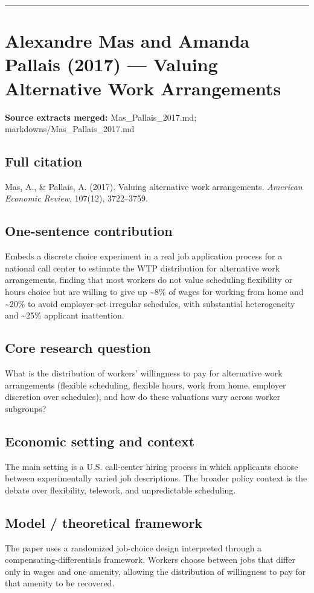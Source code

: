 \documentclass[11pt,a4paper]{article}
\begin{document}
\medskip\hrule\medskip

\section*{Alexandre Mas and Amanda Pallais (2017) — Valuing Alternative Work Arrangements}

\textbf{Source extracts merged:} Mas\_Pallais\_2017.md; markdowns/Mas\_Pallais\_2017.md

\subsection*{Full citation}
Mas, A., \& Pallais, A. (2017). Valuing alternative work arrangements. \textit{American Economic Review}, 107(12), 3722--3759.

\subsection*{One-sentence contribution}
Embeds a discrete choice experiment in a real job application process for a national call center to estimate the WTP distribution for alternative work arrangements, finding that most workers do not value scheduling flexibility or hours choice but are willing to give up \textasciitilde{}8\% of wages for working from home and \textasciitilde{}20\% to avoid employer-set irregular schedules, with substantial heterogeneity and \textasciitilde{}25\% applicant inattention.

\subsection*{Core research question}
What is the distribution of workers' willingness to pay for alternative work arrangements (flexible scheduling, flexible hours, work from home, employer discretion over schedules), and how do these valuations vary across worker subgroups?

\subsection*{Economic setting and context}
The main setting is a U.S. call-center hiring process in which applicants choose between experimentally varied job descriptions. The broader policy context is the debate over flexibility, telework, and unpredictable scheduling.

\subsection*{Model / theoretical framework}
The paper uses a randomized job-choice design interpreted through a compensating-differentials framework. Workers choose between jobs that differ only in wages and one amenity, allowing the distribution of willingness to pay for that amenity to be recovered.
\end{document}
